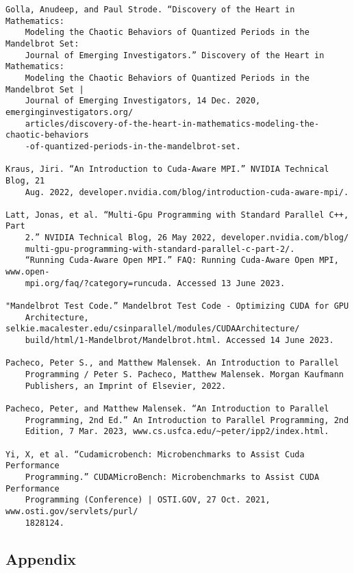 \documentclass{article}
\begin{document}
\begin{verbatim}
Golla, Anudeep, and Paul Strode. “Discovery of the Heart in Mathematics: 
    Modeling the Chaotic Behaviors of Quantized Periods in the Mandelbrot Set: 
    Journal of Emerging Investigators.” Discovery of the Heart in Mathematics:
    Modeling the Chaotic Behaviors of Quantized Periods in the Mandelbrot Set | 
    Journal of Emerging Investigators, 14 Dec. 2020, emerginginvestigators.org/
    articles/discovery-of-the-heart-in-mathematics-modeling-the-chaotic-behaviors
    -of-quantized-periods-in-the-mandelbrot-set. 
    
Kraus, Jiri. “An Introduction to Cuda-Aware MPI.” NVIDIA Technical Blog, 21 
    Aug. 2022, developer.nvidia.com/blog/introduction-cuda-aware-mpi/. 
    
Latt, Jonas, et al. “Multi-Gpu Programming with Standard Parallel C++, Part 
    2.” NVIDIA Technical Blog, 26 May 2022, developer.nvidia.com/blog/
    multi-gpu-programming-with-standard-parallel-c-part-2/. 
    “Running Cuda-Aware Open MPI.” FAQ: Running Cuda-Aware Open MPI, www.open-
    mpi.org/faq/?category=runcuda. Accessed 13 June 2023. 

"Mandelbrot Test Code.” Mandelbrot Test Code - Optimizing CUDA for GPU 
    Architecture, selkie.macalester.edu/csinparallel/modules/CUDAArchitecture/
    build/html/1-Mandelbrot/Mandelbrot.html. Accessed 14 June 2023. 

Pacheco, Peter S., and Matthew Malensek. An Introduction to Parallel 
    Programming / Peter S. Pacheco, Matthew Malensek. Morgan Kaufmann 
    Publishers, an Imprint of Elsevier, 2022. 

Pacheco, Peter, and Matthew Malensek. “An Introduction to Parallel  
    Programming, 2nd Ed.” An Introduction to Parallel Programming, 2nd 
    Edition, 7 Mar. 2023, www.cs.usfca.edu/~peter/ipp2/index.html. 

Yi, X, et al. “Cudamicrobench: Microbenchmarks to Assist Cuda Performance
    Programming.” CUDAMicroBench: Microbenchmarks to Assist CUDA Performance 
    Programming (Conference) | OSTI.GOV, 27 Oct. 2021, www.osti.gov/servlets/purl/
    1828124. 
\end{verbatim}

\pagebreak

\begin{center}

\section*{Appendix}

\end{center}
\end{document}
